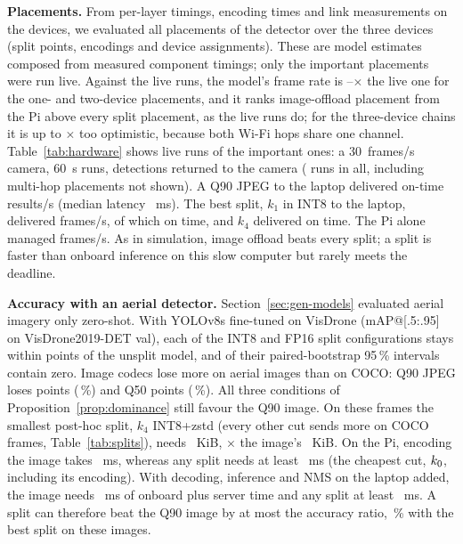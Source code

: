 \documentclass[journal,twocolumn,10pt]{IEEEtran}
\begin{document}
\textbf{Placements.} From per-layer timings, encoding times and link measurements on the devices, we evaluated all \HwNPlacements{} placements of the detector over the three devices (split points, encodings and device assignments). These are model estimates composed from measured component timings; only the important placements were run live. Against the live runs, the model's frame rate is \HwModelRatioMin--\HwModelRatioMax$\times$ the live one for the \HwModelNShort{} one- and two-device placements, and it ranks \HwModelImageAboveSplit{} image-offload placement from the Pi above every split placement, as the live runs do; for the \HwModelNThree{} three-device chains it is up to \HwModelRatioThreeMax$\times$ too optimistic, because both Wi-Fi hops share one channel. Table~\ref{tab:hardware} shows live runs of the important ones: a 30~frames/s camera, 60~s runs, detections returned to the camera (\HwLiveRuns{} runs in all, including multi-hop placements not shown). A Q90 JPEG to the laptop delivered \HwJpegOnTime{} on-time results/s (median latency \HwJpegLatMs~ms). The best split, $k_1$ in INT8 to the laptop, delivered \HwKOneFps{} frames/s, of which \HwKOneOnTime{} on time, and $k_4$ delivered \HwKFourOnTime{} on time. The Pi alone managed \HwPiSoloFps{} frames/s. As in simulation, image offload beats every split; a split is faster than onboard inference on this slow computer but rarely meets the deadline.

\begin{table}[t]
\centering
\caption{Live placements on the testbed (medians over runs; on time: within 300~ms).}
\label{tab:hardware}
{\scriptsize}
\end{table}

\textbf{Accuracy with an aerial detector.} Section~\ref{sec:gen-models} evaluated aerial imagery only zero-shot. With YOLOv8s fine-tuned on VisDrone (mAP@[.5:.95] \HwVdFullMap{} on VisDrone2019-DET val), each of the \HwVdSplitN{} INT8 and FP16 split configurations stays within \HwVdSplitMaxAbsDelta{} points of the unsplit model, and \HwVdSplitAllCiZero{} of their paired-bootstrap 95\,\% intervals contain zero. Image codecs lose more on aerial images than on COCO: Q90 JPEG loses \HwVdJpegNinetyLoss{} points (\HwVdJpegNinetyPct\,\%) and Q50 \HwVdJpegFiftyLoss{} points (\HwVdJpegFiftyPct\,\%). All three conditions of Proposition~\ref{prop:dominance} still favour the Q90 image. On these frames the smallest post-hoc split, $k_4$ INT8+zstd (every other cut sends more on COCO frames, Table~\ref{tab:splits}), needs \HwVdSplitKiB~KiB, \HwVdSplitOverJpeg$\times$ the image's \HwVdJpegNinetyKiB~KiB. On the Pi, encoding the image takes \HwPiJpegEncMs~ms, whereas any split needs at least \HwPiSplitOnboardMinMs~ms (the cheapest cut, $k_{0}$, including its encoding). With decoding, inference and NMS on the laptop added, the image needs \HwPiImgTotalMs~ms of onboard plus server time and any split at least \HwPiSplitTotalMinMs~ms. A split can therefore beat the Q90 image by at most the accuracy ratio, \HwVdBoundPct\,\% with the best split on these images.
\end{document}
